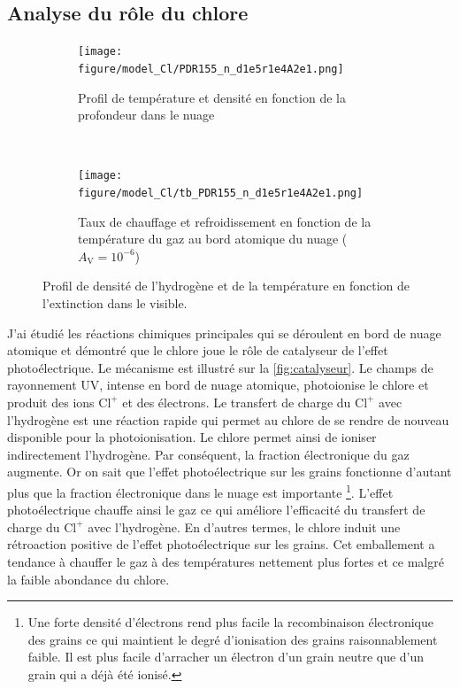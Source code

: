 \subsection{Analyse du rôle du chlore}

\begin{figure}[htbp]
    \centering
    \begin{subfigure}[t]{0.45\textwidth} %
        \centering \texttt{[image: figure/model\_Cl/PDR155\_n\_d1e5r1e4A2e1.png]}
        \caption{Profil de température et densité en fonction de la profondeur dans le nuage}\label{fig:ClT}
    \end{subfigure}
    ~ 
    \begin{subfigure}[t]{0.45\textwidth}
        \centering \texttt{[image: figure/model\_Cl/tb\_PDR155\_n\_d1e5r1e4A2e1.png]}
        \caption{Taux de chauffage et refroidissement en fonction de la température du gaz au bord atomique du nuage ($A_{\mathrm{V}} = 10^{-6}$)}\label{fig:ClHC}
    \end{subfigure}
    \caption{Profil de densité de l'hydrogène et de la température en fonction de l'extinction dans le visible.}
\end{figure}

J'ai étudié les réactions chimiques principales qui se déroulent en bord de nuage atomique et démontré que le chlore joue le rôle de catalyseur de l'effet photoélectrique. Le mécanisme est illustré sur la \autoref{fig:catalyseur}.
Le champs de rayonnement UV, intense en bord de nuage atomique, photoionise le chlore et produit des ions $\mathrm{Cl}^+$ et des électrons. Le transfert de charge du $\mathrm{Cl}^+$ avec l'hydrogène est une réaction rapide qui permet au chlore de se rendre de nouveau disponible pour la photoionisation. Le chlore permet ainsi de ioniser indirectement l'hydrogène. Par conséquent, la fraction électronique du gaz augmente.  
Or on sait que l'effet photoélectrique sur les grains fonctionne d'autant plus que la fraction électronique dans le nuage est importante \footnote{Une forte densité d'électrons rend plus facile la recombinaison électronique des grains ce qui maintient le degré d'ionisation des grains raisonnablement faible. Il est plus facile d'arracher un électron d'un grain neutre que d'un grain qui a déjà été ionisé.}. 
L'effet photoélectrique chauffe ainsi le gaz ce qui améliore l'efficacité du transfert de charge du $\mathrm{Cl}^+$ avec l'hydrogène. 
En d'autres termes, le chlore induit une rétroaction positive de l'effet photoélectrique sur les grains. Cet emballement a tendance à chauffer le gaz à des températures nettement plus fortes et ce malgré la faible abondance du chlore. \newline

